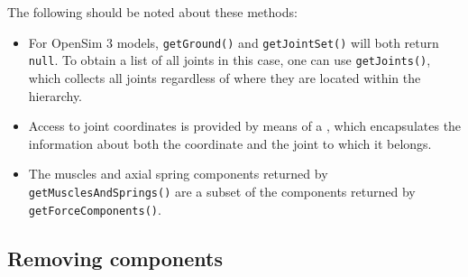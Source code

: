 %
%
The following should be noted about these methods:

\begin{itemize}

\item For OpenSim 3 models, {\tt getGround()} and {\tt getJointSet()} will both
return {\tt null}. To obtain a list of all joints in this case, one can use
{\tt getJoints()}, which collects all joints regardless of where they are
located within the hierarchy.

\item Access to joint coordinates is provided by means of a 
, which encapsulates
the information about both the coordinate and the joint to which it belongs.

\item The muscles and axial spring components returned by {\tt
getMusclesAndSprings()} are a subset of the components returned by {\tt
getForceComponents()}.

\end{itemize}

\subsection{Removing components}
\label{OpenSimRemoving:sec}

